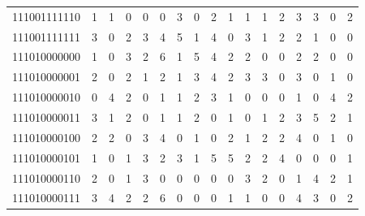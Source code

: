 \documentclass[10pt,a4paper]{article}
\begin{document}
\begin{longtable}{ |c|c|c|c|c|c|c|c|c|c|c|c|c|c|c|c|c| }
    111001111110              & 1                            & 1                                & 0                            & 0                              & 0   & 3   & 0   & 2   & 1   & 1   & 1   & 2   & 3   & 3   & 0   & 2   \\
    111001111111              & 3                            & 0                                & 2                            & 3                              & 4   & 5   & 1   & 4   & 0   & 3   & 1   & 2   & 2   & 1   & 0   & 0   \\
    111010000000              & 1                            & 0                                & 3                            & 2                              & 6   & 1   & 5   & 4   & 2   & 2   & 0   & 0   & 2   & 2   & 0   & 0   \\
    111010000001              & 2                            & 0                                & 2                            & 1                              & 2   & 1   & 3   & 4   & 2   & 3   & 3   & 0   & 3   & 0   & 1   & 0   \\
    111010000010              & 0                            & 4                                & 2                            & 0                              & 1   & 1   & 2   & 3   & 1   & 0   & 0   & 0   & 1   & 0   & 4   & 2   \\
    111010000011              & 3                            & 1                                & 2                            & 0                              & 1   & 1   & 2   & 0   & 1   & 0   & 1   & 2   & 3   & 5   & 2   & 1   \\
    111010000100              & 2                            & 2                                & 0                            & 3                              & 4   & 0   & 1   & 0   & 2   & 1   & 2   & 2   & 4   & 0   & 1   & 0   \\
    111010000101              & 1                            & 0                                & 1                            & 3                              & 2   & 3   & 1   & 5   & 5   & 2   & 2   & 4   & 0   & 0   & 0   & 1   \\
    111010000110              & 2                            & 0                                & 1                            & 3                              & 0   & 0   & 0   & 0   & 0   & 3   & 2   & 0   & 1   & 4   & 2   & 1   \\
    111010000111              & 3                            & 4                                & 2                            & 2                              & 6   & 0   & 0   & 0   & 1   & 1   & 0   & 0   & 4   & 3   & 0   & 2   \\

\end{longtable}
\end{document}
